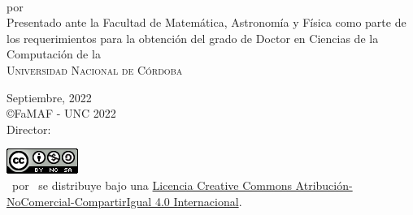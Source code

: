 \begin{titlepage}

\begin{center}
{\Large \ThesisTitle}\\ \vspace{10mm}
{\Large por \Author}\\ \vspace{30mm}
{\large Presentado ante la Facultad de Matemática, Astronomía y Física como parte de los requerimientos para la obtención del grado de Doctor en Ciencias de la Computación de la \\ \vspace{10mm}
\textsc{\large Universidad Nacional de Córdoba}}\\ \vspace{25mm}

{\large Septiembre, 2022} \\ \vspace{5mm}
{\large \copyright\;FaMAF \/- UNC 2022} \\ \vspace{5mm}
{\large Director: \Supervisor}

\vspace{10mm}
\href{https://licensebuttons.net/l/by-nc-sa/4.0/88x31.png}{\includegraphics{Figs/licencia-famaf.png}}\\
\vspace{10mm}
{\ThesisTitle\ por \Author\ se distribuye bajo una \href{https://creativecommons.org/licenses/by-nc-sa/4.0/deed.es_ES}{Licencia Creative Commons Atribución-NoComercial-CompartirIgual 4.0 Internacional}.}
\end{center}  
\end{titlepage} 



